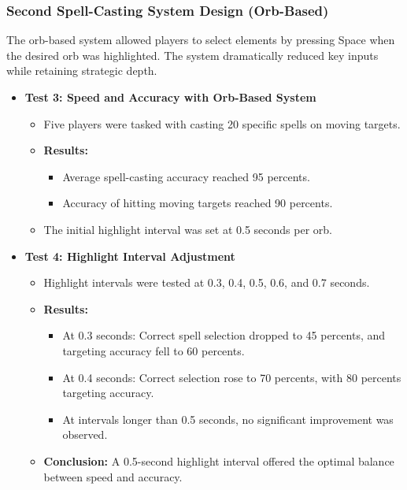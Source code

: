 \documentclass[10pt,twocolumn]{article}
\begin{document}
\subsubsection{Second Spell-Casting System Design (Orb-Based)}
The orb-based system allowed players to select elements by pressing Space when the desired orb was highlighted. The system dramatically reduced key inputs while retaining strategic depth.
\begin{itemize}
    \item \textbf{Test 3: Speed and Accuracy with Orb-Based System}
    \begin{itemize}
        \item Five players were tasked with casting 20 specific spells on moving targets.
        \item \textbf{Results:}
        \begin{itemize}
            \item Average spell-casting accuracy reached 95 percents.
            \item Accuracy of hitting moving targets reached 90 percents.
        \end{itemize}
        \item The initial highlight interval was set at 0.5 seconds per orb.
    \end{itemize}
\end{itemize}

\begin{itemize}
    \item \textbf{Test 4: Highlight Interval Adjustment}
    \begin{itemize}
        \item Highlight intervals were tested at 0.3, 0.4, 0.5, 0.6, and 0.7 seconds.
        \item \textbf{Results:}
        \begin{itemize}
            \item At 0.3 seconds: Correct spell selection dropped to 45 percents, and targeting accuracy fell to 60 percents.
            \item At 0.4 seconds: Correct selection rose to 70 percents, with 80 percents targeting accuracy.
            \item At intervals longer than 0.5 seconds, no significant improvement was observed.
        \end{itemize}
        \item \textbf{Conclusion:} A 0.5-second highlight interval offered the optimal balance between speed and accuracy.
    \end{itemize}
\end{itemize}
\end{document}
